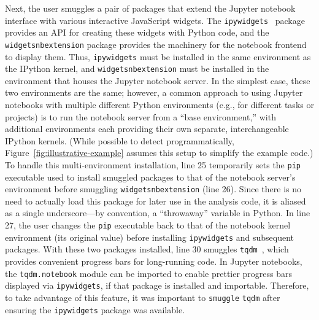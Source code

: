 \documentclass[preprint,12pt,a4paper]{elsarticle}
\begin{document}
Next, the user smuggles a pair of packages that extend the Jupyter notebook interface with various interactive JavaScript widgets. The \texttt{ipywidgets}~\cite{FredEtal15} package provides an API for creating these widgets with Python code, and the \texttt{widgetsnbextension} package provides the machinery for the notebook frontend to display them. Thus, \texttt{ipywidgets} must be installed in the same environment as the IPython kernel, and \texttt{widgetsnbextension} must be installed in the environment that houses the Jupyter notebook server. In the simplest case, these two environments are the same; however, a common approach to using Jupyter notebooks with multiple different Python environments (e.g., for different tasks or projects) is to run the notebook server from a ``base environment,'' with additional environments each providing their own separate, interchangeable IPython kernels. (While possible to detect programmatically, Figure~\ref{fig:illustrative-example} assumes this setup to simplify the example code.) To handle this multi-environment installation, line 25 temporarily sets the \texttt{pip} executable used to install smuggled packages to that of the notebook server's environment before smuggling \texttt{widgetsnbextension} (line 26). Since there is no need to actually load this package for later use in the analysis code, it is aliased as a single underscore---by convention, a ``throwaway'' variable in Python. In line 27, the user changes the \texttt{pip} executable back to that of the notebook kernel environment (its original value) before installing \texttt{ipywidgets} and subsequent packages. With these two packages installed, line 30 smuggles \texttt{tqdm}~\cite{daCoEtal22}, which provides convenient progress bars for long-running code. In Jupyter notebooks, the \texttt{tqdm.notebook} module can be imported to enable prettier progress bars displayed via \texttt{ipywidgets}, if that package is installed and importable. Therefore, to take advantage of this feature, it was important to \texttt{smuggle} \texttt{tqdm} after ensuring the \texttt{ipywidgets} package was available.
\end{document}
